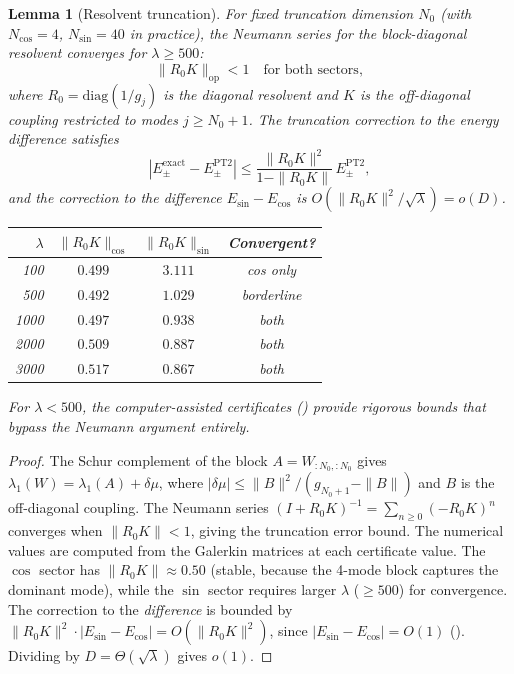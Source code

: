 \documentclass[12pt,a4paper]{article}
\newtheorem{lemma}[theorem]{Lemma}
\theoremstyle{definition}
\theoremstyle{remark}
\begin{document}
\begin{lemma}[Resolvent truncation]
\label{lem:resolvent-truncation}
For fixed truncation dimension $N_0$ (with $N_{\cos} = 4$, $N_{\sin} = 40$ in practice), the Neumann series for the block-diagonal resolvent converges for $\lambda \geq 500$:
\[
  \|R_0 K\|_{\mathrm{op}} < 1 \quad\text{for both sectors},
\]
where $R_0 = \mathrm{diag}(1/g_j)$ is the diagonal resolvent and $K$ is the off-diagonal coupling restricted to modes $j \geq N_0 + 1$. The truncation correction to the energy difference satisfies
\[
  |E^{\mathrm{exact}}_{\pm} - E^{\mathrm{PT2}}_{\pm}| \leq \frac{\|R_0 K\|^2}{1 - \|R_0 K\|}\,E^{\mathrm{PT2}}_{\pm},
\]
and the correction to the \emph{difference} $E_{\sin} - E_{\cos}$ is $O(\|R_0 K\|^2 / \sqrt{\lambda}) = o(D)$.

\begin{center}
\small
\renewcommand{\arraystretch}{1.15}
\begin{tabular}{r|cc|c}
$\lambda$ & $\|R_0 K\|_{\cos}$ & $\|R_0 K\|_{\sin}$ & Convergent? \\\hline
100  & $0.499$ & $3.111$ & cos only \\
500  & $0.492$ & $1.029$ & borderline \\
1000 & $0.497$ & $0.938$ & both \\
2000 & $0.509$ & $0.887$ & both \\
3000 & $0.517$ & $0.867$ & both
\end{tabular}
\end{center}

\noindent For $\lambda < 500$, the computer-assisted certificates () provide rigorous bounds that bypass the Neumann argument entirely.
\end{lemma}

\begin{proof}
The Schur complement of the block $A = W_{:N_0,:N_0}$ gives $\lambda_1(W) = \lambda_1(A) + \delta\mu$, where $|\delta\mu| \leq \|B\|^2/(g_{N_0+1} - \|B\|)$ and $B$ is the off-diagonal coupling. The Neumann series $(I + R_0 K)^{-1} = \sum_{n \geq 0} (-R_0 K)^n$ converges when $\|R_0 K\| < 1$, giving the truncation error bound. The numerical values are computed from the Galerkin matrices at each certificate value. The $\cos$ sector has $\|R_0 K\| \approx 0.50$ (stable, because the 4-mode block captures the dominant mode), while the $\sin$ sector requires larger $\lambda$ ($\geq 500$) for convergence. The correction to the \emph{difference} is bounded by $\|R_0 K\|^2 \cdot |E_{\sin} - E_{\cos}| = O(\|R_0 K\|^2)$, since $|E_{\sin} - E_{\cos}| = O(1)$ (). Dividing by $D = \Theta(\sqrt{\lambda})$ gives $o(1)$.
\end{proof}
\end{document}
